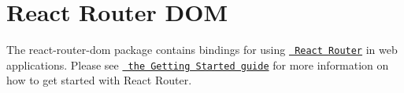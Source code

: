 \chapter{React Router DOM}
\hypertarget{md__2home_2solype_2delivery_2current__days_2trello_2front_2node__modules_2react-router-dom_2README}{}\label{md__2home_2solype_2delivery_2current__days_2trello_2front_2node__modules_2react-router-dom_2README}
\label{md__2home_2solype_2delivery_2current__days_2trello_2front_2node__modules_2react-router-dom_2README_autotoc_md12016}%
%
 The {\ttfamily react-\/router-\/dom} package contains bindings for using \href{https://github.com/remix-run/react-router}{\texttt{ React Router}} in web applications. Please see \href{https://reactrouter.com/en/main/start/tutorial}{\texttt{ the Getting Started guide}} for more information on how to get started with React Router. 